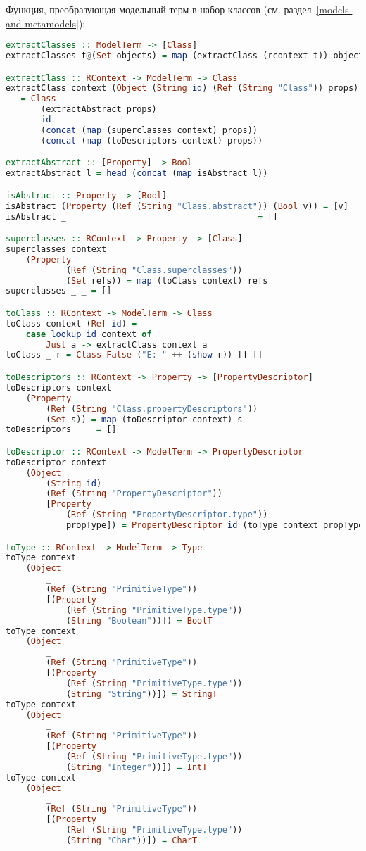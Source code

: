 %
Функция, преобразующая модельный терм в набор классов (см. раздел~\ref{models-and-metamodels}):
%
\begin{lstlisting}[language=Haskell]
extractClasses :: ModelTerm -> [Class]
extractClasses t@(Set objects) = map (extractClass (rcontext t)) objects

extractClass :: RContext -> ModelTerm -> Class
extractClass context (Object (String id) (Ref (String "Class")) props) 
   = Class 
       (extractAbstract props) 
       id 
       (concat (map (superclasses context) props)) 
       (concat (map (toDescriptors context) props))

extractAbstract :: [Property] -> Bool
extractAbstract l = head (concat (map isAbstract l))

isAbstract :: Property -> [Bool] 
isAbstract (Property (Ref (String "Class.abstract")) (Bool v)) = [v]
isAbstract _                                      = []

superclasses :: RContext -> Property -> [Class]
superclasses context 
	(Property 
			(Ref (String "Class.superclasses")) 
			(Set refs)) = map (toClass context) refs
superclasses _ _ = []

toClass :: RContext -> ModelTerm -> Class
toClass context (Ref id) = 
	case lookup id context of 
		Just a -> extractClass context a
toClass _ r = Class False ("E: " ++ (show r)) [] []

toDescriptors :: RContext -> Property -> [PropertyDescriptor]
toDescriptors context 
	(Property 
		(Ref (String "Class.propertyDescriptors")) 
		(Set s)) = map (toDescriptor context) s
toDescriptors _ _ = []

toDescriptor :: RContext -> ModelTerm -> PropertyDescriptor
toDescriptor context 
	(Object 
		(String id) 
		(Ref (String "PropertyDescriptor")) 
		[Property 
			(Ref (String "PropertyDescriptor.type")) 
			propType]) = PropertyDescriptor id (toType context propType)

toType :: RContext -> ModelTerm -> Type
toType context 
	(Object 
		_ 
		(Ref (String "PrimitiveType")) 
		[(Property 
			(Ref (String "PrimitiveType.type")) 
			(String "Boolean"))]) = BoolT
toType context 
	(Object 
		_ 
		(Ref (String "PrimitiveType")) 
		[(Property 
			(Ref (String "PrimitiveType.type")) 
			(String "String"))]) = StringT
toType context 
	(Object 
		_ 
		(Ref (String "PrimitiveType")) 
		[(Property 
			(Ref (String "PrimitiveType.type")) 
			(String "Integer"))]) = IntT
toType context 
	(Object 
		_ 
		(Ref (String "PrimitiveType")) 
		[(Property 
			(Ref (String "PrimitiveType.type")) 
			(String "Char"))]) = CharT


\end{lstlisting}
